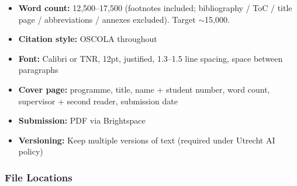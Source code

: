 \begin{itemize}
  \item \textbf{Word count:} 12,500--17,500 (footnotes included;
        bibliography / ToC / title page / abbreviations / annexes excluded).
        Target $\sim$15,000.
  \item \textbf{Citation style:} OSCOLA throughout
  \item \textbf{Font:} Calibri or TNR, 12pt, justified, 1.3--1.5 line spacing,
        space between paragraphs
  \item \textbf{Cover page:} programme, title, name + student number, word count,
        supervisor + second reader, submission date
  \item \textbf{Submission:} PDF via Brightspace
  \item \textbf{Versioning:} Keep multiple versions of text (required under
        Utrecht AI policy)
\end{itemize}

\subsubsection{File Locations}

